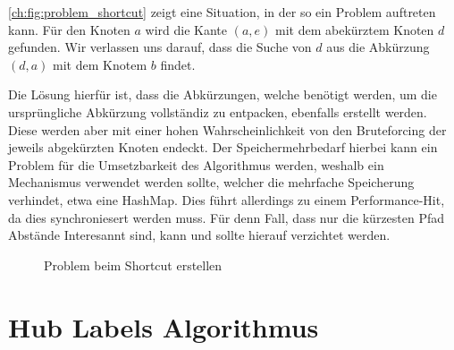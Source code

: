 \autoref{ch:fig:problem_shortcut} zeigt eine Situation, in der so ein Problem auftreten kann.
Für den Knoten $a$ wird die Kante $(a, e)$ mit dem abekürztem Knoten $d$ gefunden.
Wir verlassen uns darauf, dass die Suche von $d$ aus die Abkürzung $(d, a)$ mit dem Knotem $b$ findet.

Die Lösung hierfür ist, dass die Abkürzungen, welche benötigt werden, um die ursprüngliche Abkürzung vollständiz zu entpacken, ebenfalls erstellt werden.
Diese werden aber mit einer hohen Wahrscheinlichkeit von den Bruteforcing der jeweils abgekürzten Knoten endeckt.
Der Speichermehrbedarf hierbei kann ein Problem für die Umsetzbarkeit des Algorithmus werden, weshalb ein Mechanismus verwendet werden sollte, welcher die mehrfache Speicherung verhindet, etwa eine HashMap.
Dies führt allerdings zu einem Performance-Hit, da dies synchroniesert werden muss.
Für denn Fall, dass nur die kürzesten Pfad Abstände Interesannt sind, kann und sollte hierauf verzichtet werden.

\begin{figure}[ht]
  \centering

  \caption{Problem beim Shortcut erstellen}
  \label{ch:fig:problem_shortcut}
\end{figure}

\section{Hub Labels Algorithmus}

